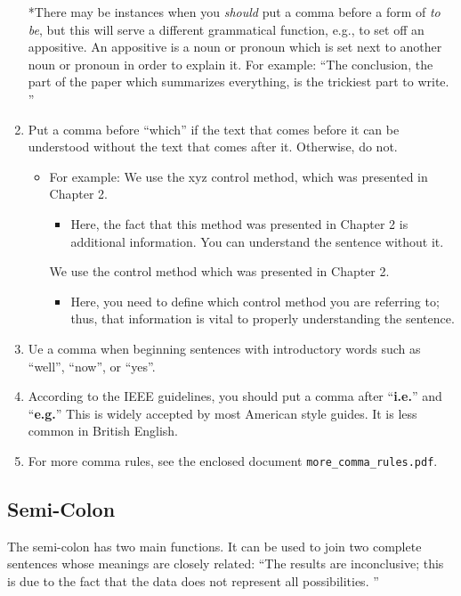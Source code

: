 \begin{enumerate}
	      *There may be instances when you \textit{should} put a comma before a form of \textit{to be}, but this will serve a different grammatical function, e.g., to set off an appositive.
	      An appositive is a noun or pronoun which is set next to another noun or pronoun in order to explain it.
	      For example: ``The conclusion, the part of the paper which summarizes everything, is the trickiest part to write.
	      ''
	\item Put a comma before ``which'' if the text that comes before it can be understood without the text that comes after it.
	      Otherwise, do not.
	      \begin{itemize}
		      \item For example: We use the xyz control method, which was presented in Chapter 2.
		            \begin{itemize}
			            \item Here, the fact that this method was presented in Chapter 2 is additional information.
			                  You can understand the sentence without it.
		            \end{itemize}
		            We use the control method which was presented in Chapter 2.
		            \begin{itemize}
			            \item Here, you need to define which control method you are referring to; thus, that information is vital to properly understanding the sentence.
		            \end{itemize}
	      \end{itemize}
	\item Ue a comma when beginning sentences with introductory words such as ``well'', ``now'', or ``yes''.
	\item According to the IEEE guidelines, you should put a comma after ``\textbf{i.e.}'' and ``\textbf{e.g.}'' This is widely accepted by most American style guides.
	      It is less common in British English.
	\item For more comma rules, see the enclosed document \texttt{more\_comma\_rules.pdf}.
\end{enumerate}

\subsection{Semi-Colon}
The semi-colon has two main functions.
It can be used to join two complete sentences whose meanings are closely related: ``The results are inconclusive; this is due to the fact that the
data does not represent all possibilities.
''

